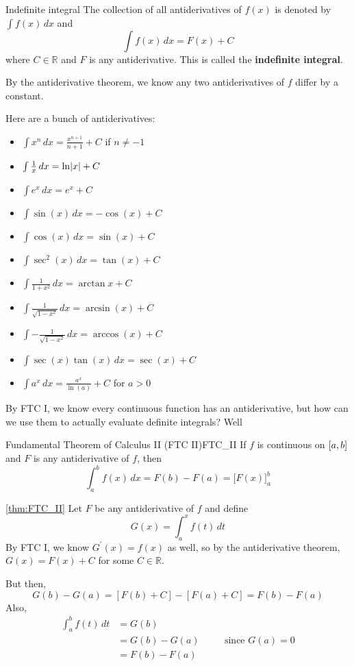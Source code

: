 \begin{Definition}{Indefinite integral}{}
    The collection of all antiderivatives of $ f(x) $ is denoted
    by $ \int f(x)\, d{x} $ and
    \[ \int f(x)\, d{x} =F(x)+C \]
    where $ C\in\mathbb{R} $ and $ F $ is any antiderivative.
    This is called the \textbf{indefinite integral}.
\end{Definition}

\begin{Remark}{}{}
    By the antiderivative theorem, we know any two antiderivatives
    of $ f $ differ by a constant.
\end{Remark}

Here are a bunch of antiderivatives:
\begin{itemize}
    \item $ \int x^n\, d{x}=\frac{x^{n+1}}{n+1}+C $ if $ n\neq -1 $
    \item $ \int \frac{1}{x}\, d{x}=\ln\lvert x\rvert+C $
    \item $ \int e^x\,d{x}=e^x+C $
    \item $ \int \sin(x)\,d{x}=-\cos(x)+C $
    \item $ \int \cos(x)\,d{x}=\sin(x)+C $
    \item $ \int \sec^2(x)\,d{x}=\tan(x)+C $
    \item $ \int \frac{1}{1+x^2}\,d{x}=\arctan{x}+C $
    \item $ \int \frac{1}{\sqrt{1-x^2}}\,d{x}=\arcsin(x)+C $
    \item $ \int -\frac{1}{\sqrt{1-x^2}}\, d{x}=\arccos(x)+C $
    \item $ \int \sec(x)\tan(x)\,d{x}=\sec(x)+C $
    \item $ \int a^x\,d{x}=\frac{a^x}{\ln(a)}+C $ for $ a>0 $
\end{itemize}

By FTC I, we know every continuous function has an antiderivative,
but how can we use them to actually evaluate definite integrals?
Well\textellipsis{}

\begin{Theorem}{Fundamental Theorem of Calculus II (FTC II)}{FTC_II}
    If $ f $ is continuous on $ \interval{a}{b} $ and $ F $
    is any antiderivative of $ f $, then
    \[ \int_{a}^{b} f(x)\, d{x} =F(b)-F(a)
        =\bigl[F(x)\bigr]_{a}^b \]
\end{Theorem}

\begin{Proof}{\ref{thm:FTC_II}}{}
    Let $ F $ be any antiderivative of $ f $ and define
    \[ G(x)=\int_{a}^{x} f(t)\, d{t} \]
    By FTC I, we know $ G^\prime(x)=f(x) $ as well, so by the
    antiderivative theorem, $ G(x)=F(x)+C $ for some $ C\in\mathbb{R} $.

    But then,
    \[ G(b)-G(a)=[F(b)+C]-[F(a)+C]=F(b)-F(a) \]
    Also,
    \begin{align*}
        \int_{a}^{b} f(t)\, d{t}
         & =G(b)                                    \\
         & =G(b)-G(a) & \quad & \text{since }G(a)=0 \\
         & =F(b)-F(a)
    \end{align*}
\end{Proof}

